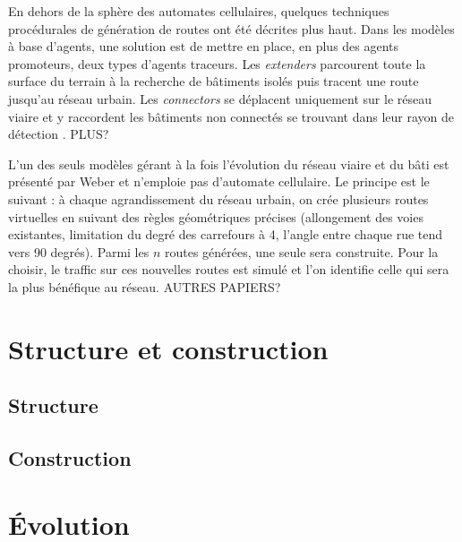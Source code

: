 \documentclass[10pt]{article}
\begin{document}
\begin{multicols}{2}
En dehors de la sphère des automates cellulaires, quelques techniques
procédurales de génération de routes ont été décrites plus haut. Dans
les modèles à base d'agents, une solution est de mettre en place, en
plus des agents promoteurs, deux types d'agents traceurs. Les
\textit{extenders} parcourent toute la surface du terrain à la
recherche de bâtiments isolés puis tracent une route jusqu'au réseau
urbain. Les \textit{connectors} se déplacent uniquement sur le réseau
viaire et y raccordent les bâtiments non connectés se trouvant dans
leur rayon de détection \cite{Lechnera}. PLUS?

L'un des seuls modèles gérant à la fois l'évolution du réseau viaire
et du bâti est présenté par Weber \cite{Weber2009} et n'emploie pas
d'automate cellulaire. Le principe est le suivant : à chaque
agrandissement du réseau urbain, on crée plusieurs routes virtuelles
en suivant des règles géométriques précises (allongement des voies
existantes, limitation du degré des carrefours à 4, l'angle entre
chaque rue tend vers 90 degrés). Parmi les $n$ routes générées, une
seule sera construite. Pour la choisir, le traffic sur ces nouvelles
routes est simulé et l'on identifie celle qui sera la plus bénéfique
au réseau. AUTRES PAPIERS?

\section{Structure et construction}

\subsection{Structure}



\subsection{Construction}

\section{\'Evolution}

\end{multicols}

\printbibliography
\end{document}
